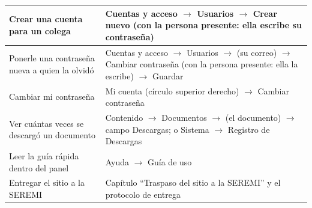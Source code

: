 \documentclass[11pt,letterpaper]{report}
\begin{document}
\begin{longtable}{>{\raggedright\arraybackslash}p{}>{\raggedright\arraybackslash}p{}}
\rowcolor{filaalt}Crear una cuenta para un colega & Cuentas y acceso $\rightarrow$ Usuarios $\rightarrow$ Crear nuevo (con la persona presente: ella escribe su contraseña) \\ \midrule
Ponerle una contraseña nueva a quien la olvidó & Cuentas y acceso $\rightarrow$ Usuarios $\rightarrow$ (su correo) $\rightarrow$ Cambiar contraseña (con la persona presente: ella la escribe) $\rightarrow$ Guardar \\ \midrule
\rowcolor{filaalt}Cambiar mi contraseña & Mi cuenta (círculo superior derecho) $\rightarrow$ Cambiar contraseña \\ \midrule
Ver cuántas veces se descargó un documento & Contenido $\rightarrow$ Documentos $\rightarrow$ (el documento) $\rightarrow$ campo Descargas; o Sistema $\rightarrow$ Registro de Descargas \\ \midrule
\rowcolor{filaalt}Leer la guía rápida dentro del panel & Ayuda $\rightarrow$ Guía de uso \\ \midrule
Entregar el sitio a la SEREMI & Capítulo “Traspaso del sitio a la SEREMI” y el protocolo de entrega \\ \bottomrule
\end{longtable}
\end{document}
